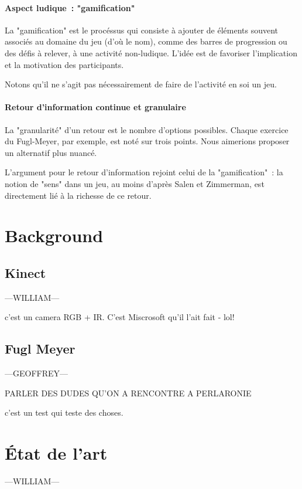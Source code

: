 \documentclass{report}
\begin{document}
		\subsubsection{Aspect ludique~: "gamification"}
		La "gamification" est le procéssus qui consiste à ajouter de éléments 
		souvent associés au domaine du jeu (d'où le nom), comme des barres de
		progression ou des défis à relever, à une activité non-ludique. L'idée est 
		de favoriser l'implication et la motivation des participants. 
		
		Notons qu'il ne s'agit pas nécessairement de faire de l'activité en soi un 
		jeu.
		
		
    \subsubsection{Retour d'information continue et granulaire}
    La "granularité" d'un retour est le nombre d'options possibles. 
    Chaque exercice du Fugl-Meyer, par exemple, est noté sur trois points. Nous 
    aimerions proposer un alternatif plus nuancé.
    
    L'argument pour le retour d'information rejoint celui de la "gamification"~:
    la notion de "sens" dans un jeu, au moins d'après Salen et Zimmerman, est 
    directement lié à la richesse de ce retour.
    

		
	\chapter{Background}
		\section{Kinect} 		---WILLIAM---
		
		c'est un camera RGB + IR. C'est Miscrosoft qu'il l'ait fait - lol!
		
		\section{Fugl Meyer} 		---GEOFFREY---
		
		PARLER DES DUDES QU'ON A RENCONTRE A PERLARONIE
		
		
		c'est un test qui teste des choses.
		
	\chapter{État de l'art} 		---WILLIAM---
	
\end{document}
